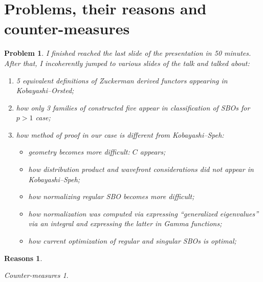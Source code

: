 \documentclass[12pt]{article} %
\theoremstyle{theorem}
\newtheorem{problem}{Problem}
\theoremstyle{definition}
\newtheorem{reason}{Reasons}
\theoremstyle{remark}
\newtheorem{countermeasure}{Counter-measures}
\begin{document}
\section{Problems, their reasons and counter-measures}
\begin{problem}
    I finished reached the last slide of the presentation in 50 minutes.
    After that, I incoherently jumped to various slides of the talk and talked about:\begin{enumerate}
        \item 5 equivalent definitions of Zuckerman derived functors appearing in Kobayashi--Orsted;
        \item how only 3 families of constructed five appear in classification of SBOs for $p>1$ case;
        \item how method of proof in our case is different from Kobayashi--Speh:\begin{itemize}
                \item geometry becomes more difficult: $C$
            appears;
                \item  how distribution product and wavefront considerations did not appear in Kobayashi--Speh;
                \item how normalizing regular SBO becomes more difficult;
                \item how normalization was computed via expressing ``generalized eigenvalues'' via an integral
                    and expressing the latter in Gamma functions;
                \item how current optimization of regular and singular SBOs is optimal;
            \end{itemize}
    \end{enumerate}
\end{problem}
\begin{reason}

\end{reason}
\begin{countermeasure}

\end{countermeasure}
\end{document}
